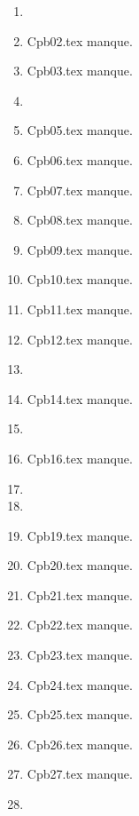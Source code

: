 \begin{enumerate}
  \item  
  \item Cpb02.tex manque. 
  \item Cpb03.tex manque. 
  \item  
  \item Cpb05.tex manque. 
  \item Cpb06.tex manque. 
  \item Cpb07.tex manque. 
  \item Cpb08.tex manque. 
  \item Cpb09.tex manque. 
  \item Cpb10.tex manque. 
  \item Cpb11.tex manque. 
  \item Cpb12.tex manque. 
  \item  
  \item Cpb14.tex manque. 
  \item  
  \item Cpb16.tex manque. 
  \item  
  \item  
  \item Cpb19.tex manque. 
  \item Cpb20.tex manque. 
  \item Cpb21.tex manque. 
  \item Cpb22.tex manque. 
  \item Cpb23.tex manque. 
  \item Cpb24.tex manque. 
  \item Cpb25.tex manque. 
  \item Cpb26.tex manque. 
  \item Cpb27.tex manque. 
  \item  
\end{enumerate} 
